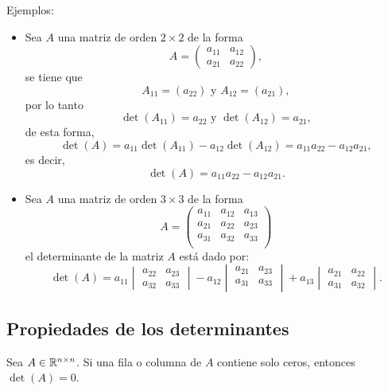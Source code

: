\documentclass[a4,11pt]{aleph-notas}
\begin{document}
Ejemplos:
\begin{itemize}
\item 
    Sea $A$ una matriz de orden $2 \times 2$ de la forma
    \[ 
        A=
        \begin{pmatrix}
         a_{11} & a_{12}\\
         a_{21} & a_{22}
        \end{pmatrix},
    \]
    se tiene que
    \[
        A_{11} = (a_{22})
        \text{ y }
        A_{12} = (a_{21}),
    \]
    por lo tanto
    \[
        \det(A_{11}) = a_{22}
        \text{ y }
        \det(A_{12}) = a_{21},
    \]
    de esta forma,
    \[
        \det(A) = a_{11}\det(A_{11}) - a_{12}\det(A_{12})
            = a_{11}a_{22} - a_{12}a_{21},
    \]
    es decir,
    \[
        \det(A) = a_{11}a_{22} - a_{12}a_{21}.
    \]
\item Sea $A$ una matriz de orden $3 \times 3$ de la forma
         \[ A=
        \begin{pmatrix}
         a_{11} & a_{12} & a_{13}\\
         a_{21} & a_{22} & a_{23}\\
         a_{31} & a_{32} & a_{33}\\
        \end{pmatrix}
        \]
        \noindent el determinante de la matriz $A$ está dado por:
        \[
        \det(A) = a_{11}
        \begin{vmatrix}
        a_{22} & a_{23} \\
        a_{32} & a_{33}
        \end{vmatrix} - a_{12}
        \begin{vmatrix}
        a_{21} & a_{23} \\
        a_{31} & a_{33} \\
        \end{vmatrix}+ a_{13}
        \begin{vmatrix}
        a_{21} & a_{22} \\
        a_{31} & a_{32}
        \end{vmatrix}.
        \]
\end{itemize}

\subsection{Propiedades de los determinantes}

\begin{teo}
    Sea $A \in \Mat[\R]{n}{n}$. Si una fila o columna de $A$ contiene solo ceros, entonces $\det (A) =0$.
\end{teo}
\end{document}
